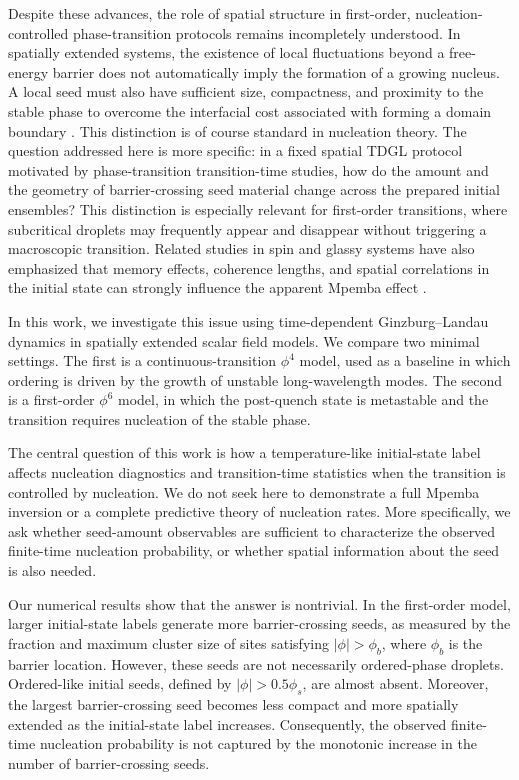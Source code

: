 ﻿\documentclass[aps,pre,preprint,showkeys,amsmath,amssymb,superscriptaddress,longbibliography]{revtex4-2}
\begin{document}
Despite these advances, the role of spatial structure in first-order, nucleation-controlled phase-transition protocols remains incompletely understood. In spatially extended systems, the existence of local fluctuations beyond a free-energy barrier does not automatically imply the formation of a growing nucleus. A local seed must also have sufficient size, compactness, and proximity to the stable phase to overcome the interfacial cost associated with forming a domain boundary \cite{CahnHilliard1958,AllenCahn1979,KeltonGreer2010}. This distinction is of course standard in nucleation theory. The question addressed here is more specific: in a fixed spatial TDGL protocol motivated by phase-transition transition-time studies, how do the amount and the geometry of barrier-crossing seed material change across the prepared initial ensembles? This distinction is especially relevant for first-order transitions, where subcritical droplets may frequently appear and disappear without triggering a macroscopic transition. Related studies in spin and glassy systems have also emphasized that memory effects, coherence lengths, and spatial correlations in the initial state can strongly influence the apparent Mpemba effect \cite{BaityJesi2019PNAS,Vadakkayil2021,Chatterjee2024}.

In this work, we investigate this issue using time-dependent Ginzburg--Landau dynamics in spatially extended scalar field models. We compare two minimal settings. The first is a continuous-transition $\phi^4$ model, used as a baseline in which ordering is driven by the growth of unstable long-wavelength modes. The second is a first-order $\phi^6$ model, in which the post-quench state is metastable and the transition requires nucleation of the stable phase.

The central question of this work is how a temperature-like initial-state label affects nucleation diagnostics and transition-time statistics when the transition is controlled by nucleation. We do not seek here to demonstrate a full Mpemba inversion or a complete predictive theory of nucleation rates. More specifically, we ask whether seed-amount observables are sufficient to characterize the observed finite-time nucleation probability, or whether spatial information about the seed is also needed.

Our numerical results show that the answer is nontrivial. In the first-order model, larger initial-state labels generate more barrier-crossing seeds, as measured by the fraction and maximum cluster size of sites satisfying $|\phi|>\phi_b$, where $\phi_b$ is the barrier location. However, these seeds are not necessarily ordered-phase droplets. Ordered-like initial seeds, defined by $|\phi|>0.5\phi_s$, are almost absent. Moreover, the largest barrier-crossing seed becomes less compact and more spatially extended as the initial-state label increases. Consequently, the observed finite-time nucleation probability is not captured by the monotonic increase in the number of barrier-crossing seeds.
\end{document}
